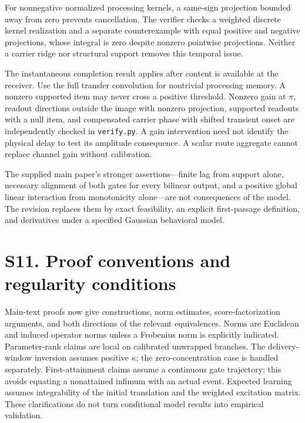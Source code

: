\documentclass[11pt,a4paper]{article}
\begin{document}
For nonnegative normalized processing kernels, a same-sign projection bounded away from zero prevents cancellation. The verifier checks a weighted discrete kernel realization and a separate counterexample with equal positive and negative projections, whose integral is zero despite nonzero pointwise projections. Neither a carrier ridge nor structural support removes this temporal issue.

The instantaneous completion result applies after content is available at the receiver. Use the full transfer convolution for nontrivial processing memory. A nonzero supported item may never cross a positive threshold. Nonzero gain at $\pi$, readout directions outside the image with nonzero projection, supported readouts with a null item, and compensated carrier phase with shifted transient onset are independently checked in \texttt{verify.py}. A gain intervention need not identify the physical delay to test its amplitude consequence. A scalar route aggregate cannot replace channel gain without calibration.

The supplied main paper's stronger assertions---finite lag from support alone, necessary alignment of both gates for every bilinear output, and a positive global linear interaction from monotonicity alone---are not consequences of the model. The revision replaces them by exact feasibility, an explicit first-passage definition, and derivatives under a specified Gaussian behavioral model.
\section*{S11. Proof conventions and regularity conditions}
Main-text proofs now give constructions, norm estimates, score-factorization arguments, and both directions of the relevant equivalences. Norms are Euclidean and induced operator norms unless a Frobenius norm is explicitly indicated. Parameter-rank claims are local on calibrated unwrapped branches. The delivery-window inversion assumes positive $\kappa$; the zero-concentration case is handled separately. First-attainment claims assume a continuous gate trajectory; this avoids equating a nonattained infimum with an actual event. Expected learning assumes integrability of the initial translation and the weighted excitation matrix. These clarifications do not turn conditional model results into empirical validation.
\end{document}
